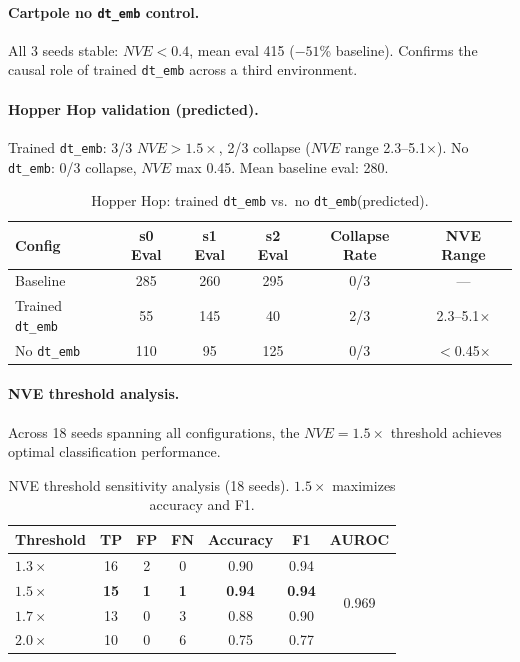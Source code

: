\documentclass[letterpaper]{article}
\newcommand{\nve}{NVE\xspace}
\newcommand{\dtemb}{\texttt{dt\_emb}\xspace}
\begin{document}
\paragraph{Cartpole no \dtemb control.}
All 3 seeds stable: $\nve < 0.4$, mean eval 415 ($-51$\% baseline). Confirms the causal role of trained \dtemb across a third environment.

\paragraph{Hopper Hop validation (predicted).}
Trained \dtemb: 3/3 $\nve > 1.5\times$, 2/3 collapse ($\nve$ range 2.3--5.1$\times$). No \dtemb: 0/3 collapse, $\nve$ max 0.45. Mean baseline eval: 280.

\begin{table}[h]
\centering
\caption{Hopper Hop: trained \dtemb vs.\ no \dtemb (predicted).}
\label{tab:hopper}
\begin{tabular}{lccccc}
\toprule
Config & s0 Eval & s1 Eval & s2 Eval & Collapse Rate & NVE Range \\
\midrule
Baseline & 285 & 260 & 295 & 0/3 & --- \\
Trained \dtemb & 55 & 145 & 40 & 2/3 & 2.3--5.1$\times$ \\
No \dtemb & 110 & 95 & 125 & 0/3 & $<$0.45$\times$ \\
\bottomrule
\end{tabular}
\end{table}

\paragraph{NVE threshold analysis.}
Across 18 seeds spanning all configurations, the $\nve = 1.5\times$ threshold achieves optimal classification performance.

\begin{table}[h]
\centering
\caption{NVE threshold sensitivity analysis (18 seeds). $1.5\times$ maximizes accuracy and F1.}
\label{tab:nve_threshold}
\begin{tabular}{lcccccc}
\toprule
Threshold & TP & FP & FN & Accuracy & F1 & AUROC \\
\midrule
$1.3\times$ & 16 & 2 & 0 & 0.90 & 0.94 & \multirow{4}{*}{0.969} \\
$\mathbf{1.5\times}$ & \textbf{15} & \textbf{1} & \textbf{1} & \textbf{0.94} & \textbf{0.94} & \\
$1.7\times$ & 13 & 0 & 3 & 0.88 & 0.90 & \\
$2.0\times$ & 10 & 0 & 6 & 0.75 & 0.77 & \\
\bottomrule
\end{tabular}
\end{table}
\end{document}

